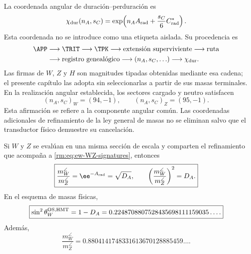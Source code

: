 La coordenada angular de duraci\'on--perduraci\'on es
\begin{equation}
\label{rm:eq:ew-angular-character}
\chi_{\rm dur}(n_A,s_C)
=\exp\!\left(n_AA_{\rm rad}
+\frac{s_C}{6}C^*_{\rm rad}\right).
\end{equation}
Esta coordenada no se introduce como una etiqueta aislada. Su procedencia es
\begin{equation}
\label{rm:eq:ew-signature-provenance}
\begin{aligned}
\APP&\longrightarrow\TRIT\longrightarrow\TPK
\longrightarrow\text{extensión superviviente}
\longrightarrow\text{ruta}\\
&\longrightarrow\text{registro genealógico}
\longrightarrow(n_A,s_C,\ldots)
\longrightarrow\chi_{\rm dur}.
\end{aligned}
\end{equation}
Las firmas de \(W\), \(Z\) y \(H\) son magnitudes tipadas obtenidas mediante
esa cadena; el presente cap\'itulo las adopta sin seleccionarlas a partir de
sus masas terminales. En la realizaci\'on angular establecida, los sectores
cargado y neutro satisfacen
\begin{equation}
\label{rm:eq:ew-WZ-signatures}
(n_A,s_C)_W=(94,-1),
\qquad
(n_A,s_C)_Z=(95,-1).
\end{equation}
Esta afirmaci\'on se refiere a la componente angular com\'un. Las
coordenadas adicionales de refinamiento de la ley general de masas no se
eliminan salvo que el transductor f\'isico demuestre su cancelaci\'on.

\begin{theorem}
\label{rm:thm:ew-weinberg}
Si \(W\) y \(Z\) se eval\'uan en una misma secci\'on de escala y comparten
el refinamiento que acompa\~na a \cref{rm:eq:ew-WZ-signatures}, entonces
\begin{equation}
\label{rm:eq:ew-WZ-ratio}
\boxed{
\frac{m_W^{\angle}}{m_Z^{\angle}}
=\ee^{-A_{\rm rad}}=\sqrt{D_A},
\qquad
\left(\frac{m_W^{\angle}}{m_Z^{\angle}}\right)^2=D_A.}
\end{equation}
En el esquema de masas f\'isicas,
\begin{equation}
\label{rm:eq:ew-sin2thetaW}
\boxed{
\sin^2\theta_W^{\rm OS,HMT}=1-D_A
=0.2248708807528435698111159035\ldots .}
\end{equation}
Adem\'as,
\begin{equation}
\label{rm:eq:ew-WZ-terminal-ratio}
\frac{m_W^{\angle}}{m_Z^{\angle}}
=0.8804141748331613670128885459\ldots .
\end{equation}
\end{theorem}

